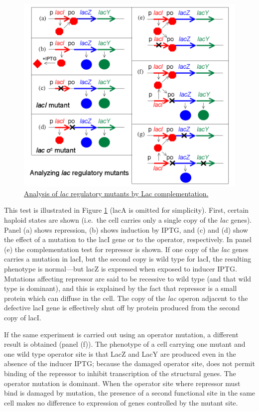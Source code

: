 \begin{figure}

{\centering \includegraphics[width=0.7\linewidth]{./figures/regulation/Lac_complementation} 

}

\caption{\href{https://commons.wikimedia.org/wiki/File:Lac_complementation.png}{Analysis of \emph{lac} regulatory mutants by Lac complementation.}}\label{fig:laccomp}
\end{figure}

This test is illustrated in Figure \ref{fig:laccomp} (lacA is omitted for simplicity). First, certain haploid states are shown (i.e.~the cell carries only a single copy of the \emph{lac} genes). Panel (a) shows repression, (b) shows induction by IPTG, and (c) and (d) show the effect of a mutation to the lacI gene or to the operator, respectively. In panel (e) the complementation test for repressor is shown. If one copy of the \emph{lac} genes carries a mutation in lacI, but the second copy is wild type for lacI, the resulting phenotype is normal---but lacZ is expressed when exposed to inducer IPTG. Mutations affecting repressor are said to be recessive to wild type (and that wild type is dominant), and this is explained by the fact that repressor is a small protein which can diffuse in the cell. The copy of the \emph{lac} operon adjacent to the defective lacI gene is effectively shut off by protein produced from the second copy of lacI.

If the same experiment is carried out using an operator mutation, a different result is obtained (panel (f)). The phenotype of a cell carrying one mutant and one wild type operator site is that LacZ and LacY are produced even in the absence of the inducer IPTG; because the damaged operator site, does not permit binding of the repressor to inhibit transcription of the structural genes. The operator mutation is dominant. When the operator site where repressor must bind is damaged by mutation, the presence of a second functional site in the same cell makes no difference to expression of genes controlled by the mutant site.

